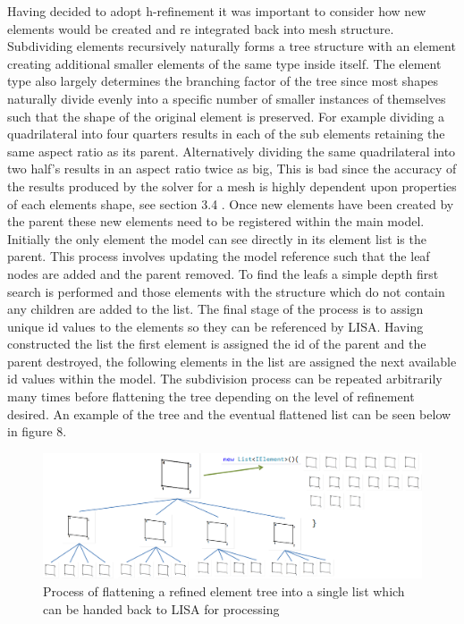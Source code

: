 \noindent
Having decided to adopt h-refinement it was important to consider how new elements would be created and re integrated back into mesh structure. Subdividing elements recursively naturally forms a tree structure with an element creating additional smaller elements of the same type inside itself. The element type also largely determines the branching factor of the tree since most shapes naturally divide evenly into a specific number of smaller instances of themselves such that the shape of the original element is preserved. For example dividing a quadrilateral into four quarters results in each of the sub elements retaining the same aspect ratio as its parent. Alternatively dividing the same quadrilateral into two half's results in an aspect ratio twice as big, This is bad since the accuracy of the results produced by the solver for a mesh is highly dependent upon properties of each elements shape, see section 3.4 \cite{DittmerMeshQualityMet}. Once new elements have been created by the parent these new elements need to be registered within the main model. Initially the only element the model can see directly in its element list is the parent. This process involves updating the model reference such that the leaf nodes are added and the parent removed. To find the leafs a simple depth first search is performed and those elements with the structure which do not contain any children are added to the list. The final stage of the process is to assign unique id values to the elements so they can be referenced by LISA. Having constructed the list the first element is assigned the id of the parent and the parent destroyed, the following elements in the list are assigned the next available id values within the model. The subdivision process can be repeated arbitrarily many times before flattening the tree depending on the level of refinement desired. An example of the tree and the eventual flattened list can be seen below in figure 8. \\


\begin{figure}[!h]
  \centerline{\includegraphics[width=150mm, scale=1]{../Graphics/ElemFlattening.png}}
  \caption{Process of flattening a refined element tree into a single list which can be handed back to LISA for processing}
  \label{fig:h-refinementImp}
\end{figure}

